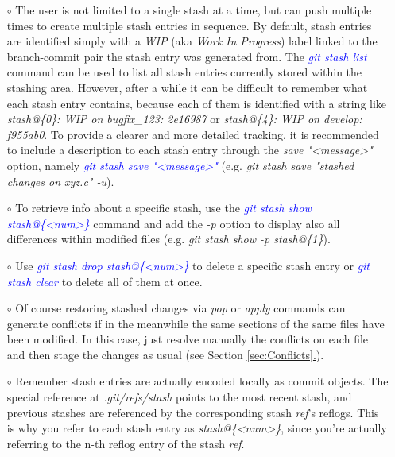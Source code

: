 \documentclass[a4paper,portrait,10pt]{article}   %
\newcommand{\mybulletlvA}{$\circ$}   %
\newcommand{\mycmd}[1]{\textcolor{blue}{\textit{#1}}}   %
\newcommand{\myvspace}{\vspace{4mm}}   %
\newcommand{\mysecref}[1]{\hyperref[#1]{\ref{#1}.}}   %
\begin{document}
\begin{itemize}
\item[\mybulletlvA] The user is not limited to a single stash at a time, but can push multiple times to create multiple stash entries in sequence. By default, stash entries are identified simply with a \textit{WIP} (aka \textit{Work In Progress}) label linked to the branch-commit pair the stash entry was generated from. The \mycmd{git stash list} command can be used to list all stash entries currently stored within the stashing area. However, after a while it can be difficult to remember what each stash entry contains, because each of them is identified with a string like \textit{stash@\{0\}: WIP on bugfix\_123: 2e16987} or \textit{stash@\{4\}: WIP on develop: f955ab0}. To provide a clearer and more detailed tracking, it is recommended to include a description to each stash entry through the \textit{save "<message>"} option, namely \mycmd{git stash save "<message>"} (e.g. \textit{git stash save "stashed changes on xyz.c" -u}).
\myvspace

\item[\mybulletlvA] To retrieve info about a specific stash, use the \mycmd{git stash show stash@\{<num>\}} command and add the \textit{-p} option to display also all differences within modified files (e.g. \textit{git stash show -p stash@\{1\}}).
\myvspace

\item[\mybulletlvA] Use \mycmd{git stash drop stash@\{<num>\}} to delete a specific stash entry or \mycmd{git stash clear} to delete all of them at once.
\myvspace

\item[\mybulletlvA] Of course restoring stashed changes via \textit{pop} or \textit{apply} commands can generate conflicts if in the meanwhile the same sections of the same files have been modified. In this case, just resolve manually the conflicts on each file and then stage the changes as usual (see Section \mysecref{sec:Conflicts}).
\myvspace

\item[\mybulletlvA] Remember stash entries are actually encoded locally as commit objects. The special reference at \textit{.git/refs/stash} points to the most recent stash, and previous stashes are referenced by the corresponding stash \textit{ref}'s reflogs. This is why you refer to each stash entry as \textit{stash@\{<num>\}}, since you're actually referring to the n-th reflog entry of the stash \textit{ref}.
\myvspace


\end{itemize}
\end{document}

